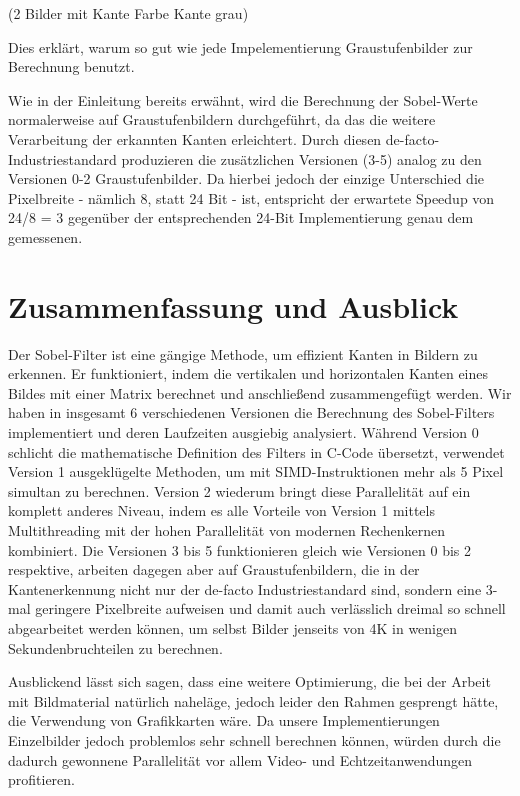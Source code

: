 \documentclass[course=erap]{aspdoc}
\begin{document}
(2 Bilder mit Kante Farbe Kante grau)

Dies erklärt, warum so gut wie jede Impelementierung Graustufenbilder zur Berechnung benutzt.

Wie in der Einleitung bereits erwähnt, wird die Berechnung der Sobel-Werte normalerweise auf Graustufenbildern durchgeführt, da das die weitere Verarbeitung der erkannten Kanten erleichtert.
Durch diesen de-facto-Industriestandard produzieren die zusätzlichen Versionen (3-5) analog zu den Versionen 0-2 Graustufenbilder.
Da hierbei jedoch der einzige Unterschied die Pixelbreite - nämlich 8, statt 24 Bit - ist, entspricht der erwartete Speedup von 24/8 = 3 gegenüber der entsprechenden 24-Bit Implementierung genau dem gemessenen.
\section{Zusammenfassung und Ausblick}
\label{sec:zusammenfassung}
Der Sobel-Filter ist eine gängige Methode, um effizient Kanten in Bildern zu erkennen.
Er funktioniert, indem die vertikalen und horizontalen Kanten eines Bildes mit einer Matrix berechnet und anschließend zusammengefügt werden.
Wir haben in insgesamt 6 verschiedenen Versionen die Berechnung des Sobel-Filters implementiert und deren Laufzeiten ausgiebig analysiert.
Während Version 0 schlicht die mathematische Definition des Filters in C-Code übersetzt, verwendet Version 1 ausgeklügelte Methoden, um mit SIMD-Instruktionen mehr als 5 Pixel simultan zu berechnen.
Version 2 wiederum bringt diese Parallelität auf ein komplett anderes Niveau, indem es alle Vorteile von Version 1 mittels Multithreading mit der hohen Parallelität von modernen Rechenkernen kombiniert.
Die Versionen 3 bis 5 funktionieren gleich wie Versionen 0 bis 2 respektive, arbeiten dagegen aber auf Graustufenbildern, die in der Kantenerkennung nicht nur der de-facto Industriestandard sind, sondern eine 3-mal geringere Pixelbreite aufweisen und damit auch verlässlich dreimal so schnell abgearbeitet werden können, um selbst Bilder jenseits von 4K in wenigen Sekundenbruchteilen zu berechnen.

Ausblickend lässt sich sagen, dass eine weitere Optimierung, die bei der Arbeit mit Bildmaterial natürlich naheläge, jedoch leider den Rahmen gesprengt hätte, die Verwendung von Grafikkarten wäre.
Da unsere Implementierungen Einzelbilder jedoch problemlos sehr schnell berechnen können, würden durch die dadurch gewonnene Parallelität vor allem Video- und Echtzeitanwendungen profitieren.



\end{document}

